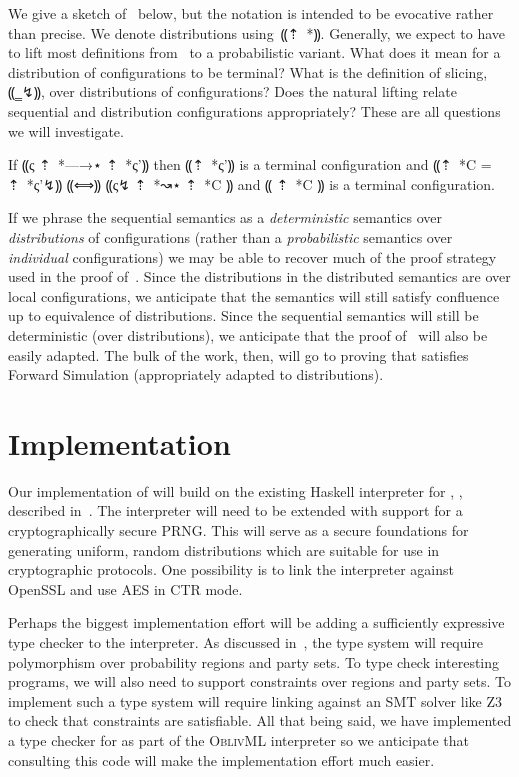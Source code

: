 We give a sketch of~ below, but the notation is intended to be evocative rather
than precise. We denote distributions using~⸨⇡~*{}⸩. Generally, we expect to have to lift most definitions from~
to a probabilistic variant. What does it mean for a distribution of configurations to be terminal? What is the definition of slicing, ⸨‗↯⸩,
over distributions of configurations? Does the natural lifting relate sequential and distribution configurations appropriately? These
are all questions we will investigate.

\begin{theorem}\label{thm:lang-simulation}
    If ⸨ς ⇡~*{—→}⋆ ⇡~*{ς'}⸩ then ⸨⇡~*{ς'}⸩ is a terminal configuration and ⸨⇡~*C = ⇡~*{ς'}↯⸩ ⸨⟺⸩ ⸨ς↯ ⇡~*{↝}⋆ ⇡~*C ⸩ and ⸨ ⇡~*C ⸩ is a terminal configuration.
\end{theorem}

If we phrase the sequential semantics as a \emph{deterministic} semantics over \emph{distributions} of configurations
(rather than a \emph{probabilistic} semantics over \emph{individual} configurations) we may be able to recover much
of the proof strategy used in the proof of~. Since the distributions in the distributed
semantics are over local configurations, we anticipate that the semantics will still satisfy confluence up to equivalence
of distributions. Since the sequential semantics will still be deterministic (over distributions), we anticipate that the
proof of~ will also be easily adapted. The bulk of the work, then, will go to proving that
\lang satisfies Forward Simulation (appropriately adapted to distributions).

\section{Implementation}
\label{sec:proposal-impl}

Our implementation of \lang will build on the existing Haskell interpreter for \mpc, \system, described in~.
The interpreter will need to be extended with support for a cryptographically secure PRNG. This will serve as a secure foundations for
generating uniform, random distributions which are suitable for use in cryptographic protocols. One possibility is to link the interpreter
against OpenSSL and use AES in CTR mode.

Perhaps the biggest implementation effort will be adding a sufficiently expressive type checker to the interpreter. As discussed
in~, the type system will require polymorphism over probability regions and party sets. To
type check interesting programs, we will also need to support constraints over regions and party sets. To implement such a type system
will require linking against an SMT solver like Z3~\cite{} to check that constraints are satisfiable. All that being said, we have
implemented a type checker for \obliv as part of the \textsc{OblivML} interpreter so we anticipate that consulting this code
will make the implementation effort much easier.

